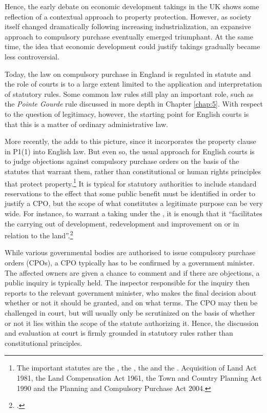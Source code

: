 \documentclass[12pt,a4paper]{book} %
\begin{document}
Hence, the early debate on economic development takings in the UK shows some reflection of a contextual approach to property protection. However, as society itself changed dramatically following increasing industrialization, an expansive approach to compulsory purchase eventually emerged triumphant. At the same time, the idea that economic development could justify takings gradually became less controversial. 

Today, the law on compulsory purchase in England is regulated in statute and the role of courts is to a large extent limited to the application and interpretation of statutory rules. Some common law rules still play an important role, such as the {\it Pointe Gourde} rule discussed in more depth in Chapter \ref{chap:5}. With respect to the question of legitimacy, however, the starting point for English courts is that this is a matter of ordinary administrative law. 

More recently, the \cite{hra98} adds to this picture, since it incorporates the property clause in P1(1) into English law. But even so, the usual approach for English courts is to judge objections against compulsory purchase orders on the basis of the statutes that warrant them, rather than constitutional or human rights principles that protect property.\footnote{The important statutes are the \cite{ala81}, the \cite{lca61}, the \cite{tcpa90} and the \cite{pcpa04}. Acquisition of Land Act 1981, the Land Compensation Act 1961, the Town and Country Planning Act 1990 and the Planning and Compulsory Purchase Act 2004.} It is typical for statutory authorities to include standard reservations to the effect that some public benefit must be identified in order to justify a CPO, but the scope of what constitutes a legitimate purpose can be very wide. For instance, to warrant a taking under the \cite{tcpa90}, it is enough that it ``facilitates the carrying out of development, redevelopment and improvement on or in relation to the land''.\footcite[226]{tcpa90} 

While various governmental bodies are authorised to issue compulsory purchase orders (CPOs), a CPO typically has to be confirmed by a government minister. The affected owners are given a chance to comment and if there are objections, a public inquiry is typically held. The inspector responsible for the inquiry then reports to the relevant government minister, who makes the final decision about whether or not it should be granted, and on what terms. The CPO may then be challenged in court, but will usually only be scrutinized on the basis of whether or not it lies within the scope of the statute authorizing it. Hence, the discussion and evaluation at court is firmly grounded in statutory rules rather than constitutional principles.
\end{document}
